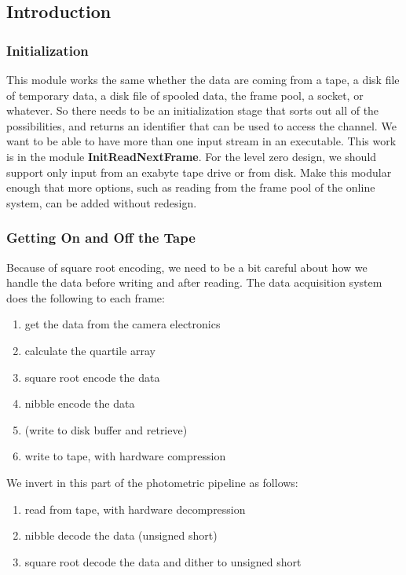 
\subsection{Introduction}

\subsubsection{Initialization}

This module works the same whether
the data are coming from a tape, a disk file of temporary data, a disk
file of spooled data, the frame pool, a socket, or whatever.  So there
needs to be an initialization stage that sorts out all of the 
possibilities, and returns an identifier that can be used to access the
channel.  We want to be able to have more than one input
stream in an executable.
This work is in the module {\bf InitReadNextFrame}.
For the level zero design, we should support only input from an
exabyte tape drive or from disk.  Make this modular enough that 
more options, such as reading from the frame pool of the online
system, can be added without redesign.

\subsubsection{Getting On and Off the Tape}

Because of square root encoding, we need to be a bit careful
about how we handle the data before writing and after reading.
The data acquisition system does the following to each frame:
\begin{enumerate}
        \item get the data from the camera electronics
        \item calculate the quartile array
        \item square root encode the data
        \item nibble encode the data
        \item (write to disk buffer and retrieve)
        \item write to tape, with hardware compression
\end{enumerate}
We invert in this part of the photometric pipeline as follows:
\begin{enumerate}
        \item read from tape, with hardware decompression
        \item nibble decode the data (unsigned short)
        \item square root decode the data and dither to unsigned short
\end{enumerate}

